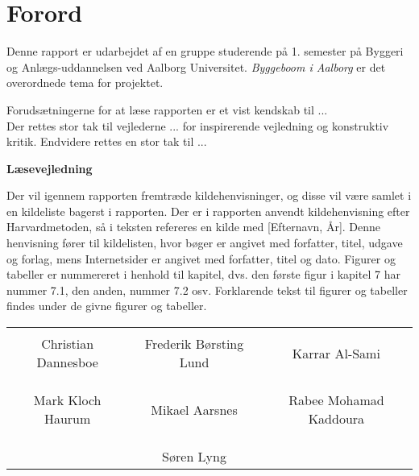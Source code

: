 \chapter*{Forord}

Denne rapport er udarbejdet af en gruppe studerende på 1. semester på Byggeri og Anlægs-uddannelsen ved Aalborg Universitet. \textit{Byggeboom i Aalborg} er det overordnede tema for projektet.

Forudsætningerne for at læse rapporten er et vist kendskab til ... \\
Der rettes stor tak til vejlederne ... for inspirerende vejledning og konstruktiv kritik. Endvidere rettes en stor tak til ...

\textbf{Læsevejledning}

Der vil igennem rapporten fremtræde kildehenvisninger, og disse vil være samlet i en kildeliste bagerst i rapporten. Der er i rapporten anvendt kildehenvisning efter Harvardmetoden, så i teksten refereres en kilde med [Efternavn, År]. Denne henvisning fører til kildelisten, hvor bøger er angivet med forfatter, titel, udgave og forlag, mens Internetsider er angivet med forfatter, titel og dato. Figurer og tabeller er nummereret i henhold til kapitel, dvs. den første figur i kapitel 7 har nummer 7.1, den anden, nummer 7.2 osv. Forklarende tekst til figurer og tabeller findes under de givne figurer og tabeller.

\phantom{Luft}

\phantom{Luft}

\begin{table}[H]
	\centering
		\begin{tabular}{c c c}
			\underline{\phantom{mmmmmmmmmmmmmm}} & \underline{\phantom{mmmmmmmmmmmmmm}} & \underline{\phantom{mmmmmmmmmmmmmm}} \\
			Christian Dannesboe			& Frederik Børsting Lund 		& Karrar Al-Sami 			\\
			&&\\
			&&\\
			\underline{\phantom{mmmmmmmmmmmmmm}} & \underline{\phantom{mmmmmmmmmmmmmm}} & \underline{\phantom{mmmmmmmmmmmmmm}} \\
			Mark Kloch Haurum			& Mikael Aarsnes 		& Rabee Mohamad Kaddoura 				\\
			&&\\
			&&\\
		 							& \underline{\phantom{mmmmmmmmmmmmmm}} 	&			\\														
									& Søren Lyng 							& 												
		\end{tabular}
\end{table}